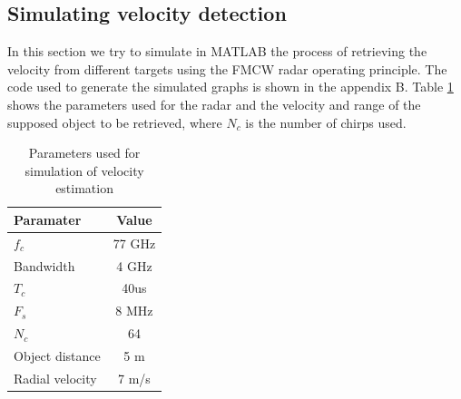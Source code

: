 \subsection{Simulating velocity detection}
In this section we try to simulate in MATLAB the process of retrieving the velocity from different targets using the \ac{FMCW} \ac{radar} operating principle. The code used to generate the simulated graphs is shown in the appendix B. Table \ref{tab:table2} shows the parameters used for the radar and the velocity and range of the supposed object to be retrieved, where $N_c$ is the number of chirps used. 
\begin{table}[ht]
  \begin{center}
    \caption{Parameters used for simulation of velocity estimation}
    \label{tab:table2}
    \begin{tabular}{l|c} %
      \textbf{Paramater} & \textbf{Value } \\
      \hline
      $f_c$ & 77 GHz \\
      Bandwidth & 4 GHz \\
      $T_c$ & 40us \\
      $F_s$ & 8 MHz \\
      $N_c$ & 64 \\
      Object distance & 5  m \\
      Radial velocity & 7  m/s
    \end{tabular}
  \end{center}
\end{table}

